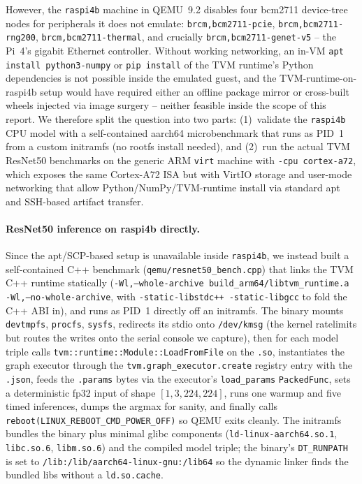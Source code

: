 \documentclass[11pt,a4paper]{article}
\begin{document}
However, the \texttt{raspi4b} machine in QEMU~9.2 disables four bcm2711 device-tree nodes for peripherals it does not emulate: \texttt{brcm,bcm2711-pcie}, \texttt{brcm,bcm2711-rng200}, \texttt{brcm,bcm2711-thermal}, and crucially \texttt{brcm,bcm2711-genet-v5} -- the Pi~4's gigabit Ethernet controller. Without working networking, an in-VM \texttt{apt install python3-numpy} or \texttt{pip install} of the TVM runtime's Python dependencies is not possible inside the emulated guest, and the TVM-runtime-on-raspi4b setup would have required either an offline package mirror or cross-built wheels injected via image surgery -- neither feasible inside the scope of this report. We therefore split the question into two parts: (1)~validate the \texttt{raspi4b} CPU model with a self-contained aarch64 microbenchmark that runs as PID~1 from a custom initramfs (no rootfs install needed), and (2)~run the actual TVM ResNet50 benchmarks on the generic ARM \texttt{virt} machine with \texttt{-cpu cortex-a72}, which exposes the same Cortex-A72 ISA but with VirtIO storage and user-mode networking that allow Python/NumPy/TVM-runtime install via standard apt and SSH-based artifact transfer.

\paragraph{ResNet50 inference on raspi4b directly.} Since the apt/SCP-based setup is unavailable inside \texttt{raspi4b}, we instead built a self-contained C++ benchmark (\texttt{qemu/\allowbreak resnet50\_\allowbreak bench.cpp}) that links the TVM C++ runtime statically (\texttt{-Wl,--whole-archive build\_arm64/\allowbreak libtvm\_runtime.a -Wl,--no-whole-archive}, with \texttt{-static-libstdc++ -static-libgcc} to fold the C++ ABI in), and runs as PID~1 directly off an initramfs. The binary mounts \texttt{devtmpfs}, \texttt{procfs}, \texttt{sysfs}, redirects its stdio onto \texttt{/dev/kmsg} (the kernel ratelimits but routes the writes onto the serial console we capture), then for each model triple calls \texttt{tvm::\allowbreak runtime::\allowbreak Module::\allowbreak LoadFromFile} on the \texttt{.so}, instantiates the graph executor through the \texttt{tvm.graph\_executor.create} registry entry with the \texttt{.json}, feeds the \texttt{.params} bytes via the executor's \texttt{load\_params} \texttt{PackedFunc}, sets a deterministic fp32 input of shape $[1,3,224,224]$, runs one warmup and five timed inferences, dumps the argmax for sanity, and finally calls \texttt{reboot(LINUX\_\allowbreak REBOOT\_\allowbreak CMD\_\allowbreak POWER\_\allowbreak OFF)} so QEMU exits cleanly. The initramfs bundles the binary plus minimal glibc components (\texttt{ld-linux-aarch64.so.1}, \texttt{libc.so.6}, \texttt{libm.so.6}) and the compiled model triple; the binary's \texttt{DT\_RUNPATH} is set to \texttt{/lib:/lib/aarch64-linux-gnu:/lib64} so the dynamic linker finds the bundled libs without a \texttt{ld.so.cache}.
\end{document}
